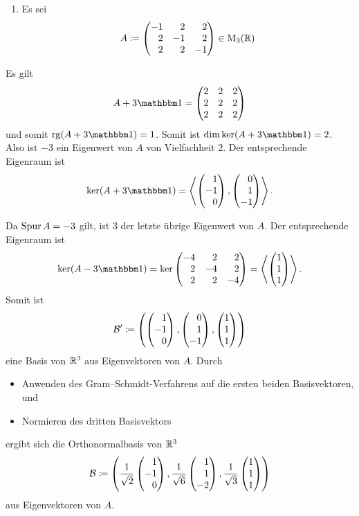 \begin{example}
\begin{enumerate}
    \item
      Es sei
      \[
                  A
        \coloneqq \begin{pmatrix*}[r]
                    -1  &  2  &  2 \\
                     2  & -1  &  2 \\
                     2  &  2  & -1
                  \end{pmatrix*}
        \in       \matrices{3}{\Real}
      \]
  \end{enumerate}
  Es gilt
  \[
      A + 3 \Id
    = \begin{pmatrix}
        2 & 2 & 2 \\
        2 & 2 & 2 \\
        2 & 2 & 2
      \end{pmatrix}
  \]
  und somit $\rank (A + 3 \Id) = 1$.
  Somit ist $\dim \ker (A + 3 \Id) = 2$.
  Also ist $-3$ ein Eigenwert von $A$ von Vielfachheit $2$.
  Der entsprechende Eigenraum ist
  \[
      \ker (A + 3 \Id)
    = \generated{ \rvect{1 \\ -1 \\ 0}, \rvect{0 \\ 1 \\ -1} }.
  \]
  
  Da $\operatorname{Spur} A  =  -3$ gilt, ist $3$ der letzte übrige Eigenwert von $A$.
  Der entsprechende Eigenraum ist
  \[
      \ker (A - 3 \Id)
    = \ker \begin{pmatrix*}[r]
            -4  &  2  &  2  \\
             2  & -4  &  2  \\
             2  &  2  & -4
          \end{pmatrix*}
    = \generated{ \vect{1 \\ 1 \\ 1} }.
  \]
  Somit ist
  \[
              \basis{B}'
    \coloneqq \left(
                \rvect{1 \\ -1 \\ 0},
                \rvect{0 \\ 1 \\ -1},
                \vect{1 \\ 1 \\ 1}
              \right)
  \]
  eine Basis von $\mathbb{R}^3$ aus Eigenvektoren von $A$.
  Durch
  \begin{itemize}
    \item
      Anwenden des Gram--Schmidt-Verfahrens auf die ersten beiden Basisvektoren, und
    \item
      Normieren des dritten Basisvektors
  \end{itemize}
  ergibt sich die Orthonormalbasis von $\mathbb{R}^3$
  \[
    \basis{B}
    \coloneqq \left(
                \frac{1}{\sqrt{2}} \rvect{1 \\ -1 \\ 0},
                \frac{1}{\sqrt{6}} \rvect{1 \\ 1 \\ -2},
                \frac{1}{\sqrt{3}} \vect{1 \\ 1 \\ 1}
              \right)
  \]
  aus Eigenvektoren von $A$.
\end{example}
